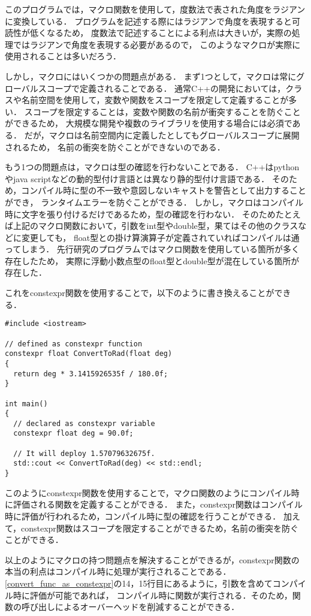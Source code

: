 このプログラムでは，マクロ関数を使用して，度数法で表された角度をラジアンに変換している．
プログラムを記述する際にはラジアンで角度を表現すると可読性が低くなるため，
度数法で記述することによる利点は大きいが，実際の処理ではラジアンで角度を表現する必要があるので，
このようなマクロが実際に使用されることは多いだろう．

しかし，マクロにはいくつかの問題点がある．
まず1つとして，マクロは常にグローバルスコープで定義されることである．
通常C++の開発においては，クラスや名前空間を使用して，変数や関数をスコープを限定して定義することが多い．
スコープを限定することは，変数や関数の名前が衝突することを防ぐことができるため，
大規模な開発や複数のライブラリを使用する場合には必須である．
だが，マクロは名前空間内に定義したとしてもグローバルスコープに展開されるため，
名前の衝突を防ぐことができないのである．

もう1つの問題点は，マクロは型の確認を行わないことである．
C++はpythonやjava scriptなどの動的型付け言語とは異なり静的型付け言語である．
そのため，コンパイル時に型の不一致や意図しないキャストを警告として出力することができ，
ランタイムエラーを防ぐことができる．
しかし，マクロはコンパイル時に文字を張り付けるだけであるため，型の確認を行わない．
そのためたとえば上記のマクロ関数において，引数をint型やdouble型，果てはその他のクラスなどに変更しても，
float型との掛け算演算子が定義されていればコンパイルは通ってしまう．
先行研究のプログラムではマクロ関数を使用している箇所が多く存在したため，
実際に浮動小数点型のfloat型とdouble型が混在している箇所が存在した．

これをconstexpr関数を使用することで，以下のように書き換えることができる．

\begin{lstlisting}[caption=convert func as constexpr,label=convert_func_as_constexpr]
#include <iostream>

// defined as constexpr function
constexpr float ConvertToRad(float deg)
{
  return deg * 3.1415926535f / 180.0f;
}

int main()
{
  // declared as constexpr variable
  constexpr float deg = 90.0f;
  
  // It will deploy 1.57079632675f.
  std::cout << ConvertToRad(deg) << std::endl;
}
\end{lstlisting}

このようにconstexpr関数を使用することで，マクロ関数のようにコンパイル時に評価される関数を定義することができる．
また，constexpr関数はコンパイル時に評価が行われるため，コンパイル時に型の確認を行うことができる．
加えて，constexpr関数はスコープを限定することができるため，名前の衝突を防ぐことができる．

以上のようにマクロの持つ問題点を解決することができるが，constexpr関数の本当の利点はコンパイル時に処理が実行されることである．
\ref{convert_func_as_constexpr}の14，15行目にあるように，引数を含めてコンパイル時に評価が可能であれば，
コンパイル時に関数が実行される．そのため，関数の呼び出しによるオーバーヘッドを削減することができる．

